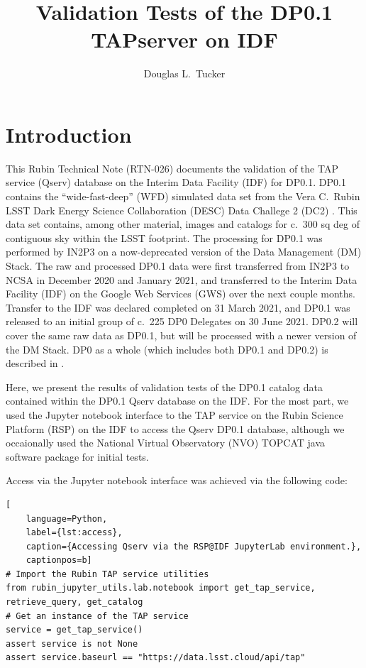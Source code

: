 \documentclass[DM,authoryear,toc]{lsstdoc}
\title{Validation Tests of the DP0.1 TAPserver on IDF}
\author{%
Douglas L.\ Tucker
}
\date{\vcsDate}
\begin{document}
\maketitle


\section{Introduction} \label{sec:intro}

This Rubin Technical Note (RTN-026) documents the validation of the
TAP service (Qserv) database on the Interim Data Facility (IDF) for
DP0.1.  DP0.1 contains the “wide-fast-deep” (WFD) simulated data set
from the Vera C.\ Rubin LSST Dark Energy Science Collaboration (DESC)
Data Challege 2 (DC2) \citep{2021ApJS..253...31L,
  2021arXiv210104855L}.  This data set contains, among other material,
images and catalogs for c.\ 300 sq deg of contiguous sky within the
LSST footprint.  The processing for DP0.1 was performed by IN2P3 on a
now-deprecated version of the Data Management (DM) Stack.  The raw and
processed DP0.1 data were first transferred from IN2P3 to NCSA in
December 2020 and January 2021, and transferred to the Interim Data
Facility (IDF) on the Google Web Services (GWS) over the next couple
months.  Transfer to the IDF was declared completed on 31 March 2021,
and DP0.1 was released to an initial group of c.\ 225 DP0 Delegates on
30 June 2021.  DP0.2 will cover the same raw data as DP0.1, but will
be processed with a newer version of the DM Stack.  DP0 as a whole
(which includes both DP0.1 and DP0.2) is described in .

Here, we present the results of validation tests of the DP0.1 catalog
data contained within the DP0.1 Qserv database on the IDF.  For the
most part, we used the Jupyter notebook interface to the TAP service
on the Rubin Science Platform (RSP) on the IDF to access the Qserv
DP0.1 database, although we occaionally used the National Virtual
Observatory (NVO) TOPCAT java software package for initial tests.

Access via the Jupyter notebook interface was achieved via the
following code:

\begin{lstlisting}[
    language=Python,
    label={lst:access},
    caption={Accessing Qserv via the RSP@IDF JupyterLab environment.},
    captionpos=b]
# Import the Rubin TAP service utilities
from rubin_jupyter_utils.lab.notebook import get_tap_service, retrieve_query, get_catalog
# Get an instance of the TAP service
service = get_tap_service()
assert service is not None
assert service.baseurl == "https://data.lsst.cloud/api/tap"
\end{lstlisting}
\end{document}
